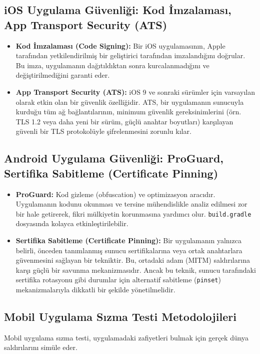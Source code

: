 \subsection{iOS Uygulama Güvenliği: Kod İmzalaması, App Transport Security (ATS)}

\begin{itemize}
\item \textbf{Kod İmzalaması (Code Signing):} Bir iOS uygulamasının, Apple tarafından yetkilendirilmiş bir geliştirici tarafından imzalandığını doğrular. Bu imza, uygulamanın dağıtıldıktan sonra kurcalanmadığını ve değiştirilmediğini garanti eder.
\item \textbf{App Transport Security (ATS):} iOS 9 ve sonraki sürümler için varsayılan olarak etkin olan bir güvenlik özelliğidir. ATS, bir uygulamanın sunucuyla kurduğu tüm ağ bağlantılarının, minimum güvenlik gereksinimlerini (örn. TLS 1.2 veya daha yeni bir sürüm, güçlü anahtar boyutları) karşılayan güvenli bir TLS protokolüyle şifrelenmesini zorunlu kılar.
\end{itemize}
\subsection{Android Uygulama Güvenliği: ProGuard, Sertifika Sabitleme (Certificate Pinning)}
\begin{itemize}
\item \textbf{ProGuard:} Kod gizleme (obfuscation) ve optimizasyon aracıdır. Uygulamanın kodunu okunması ve tersine mühendislikle analiz edilmesi zor bir hale getirerek, fikri mülkiyetin korunmasına yardımcı olur. \texttt{build.gradle} dosyasında kolayca etkinleştirilebilir.
\item \textbf{Sertifika Sabitleme (Certificate Pinning):} Bir uygulamanın yalnızca belirli, önceden tanımlanmış sunucu sertifikalarına veya ortak anahtarlara güvenmesini sağlayan bir tekniktir. Bu, ortadaki adam (MITM) saldırılarına karşı güçlü bir savunma mekanizmasıdır. Ancak bu teknik, sunucu tarafındaki sertifika rotasyonu gibi durumlar için alternatif sabitleme (\texttt{pinset}) mekanizmalarıyla dikkatli bir şekilde yönetilmelidir.
\end{itemize}

\subsection{Mobil Uygulama Sızma Testi Metodolojileri}

Mobil uygulama sızma testi, uygulamadaki zafiyetleri bulmak için gerçek dünya saldırılarını simüle eder.

